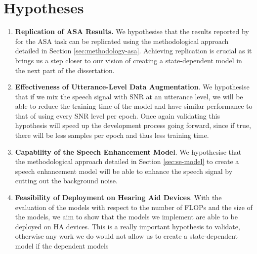 \documentclass[logo,bsc,singlespacing,parskip,online]{infthesis}
\begin{document}
\section{Hypotheses}
\label{sec:hypotheses}
\begin{enumerate}
   \item \textbf{Replication of ASA Results.} 
   We hypothesise that the results reported by \citet{Huwel2020HearDS} for the ASA task can be replicated using the methodological approach detailed in Section \ref{sec:methodology-asa}.
   Achieving replication is crucial as it brings us a step closer to our vision of creating a state-dependent model in the next part of the dissertation.
   \item \textbf{Effectiveness of Utterance-Level Data Augmentation}. We hypothesise 
   that if we mix the speech signal with SNR at an utterance level, we will be able 
   to reduce the training time of the model and have similar performance to that of using 
   every SNR level per epoch. 
   Once again validating this hypothesis will speed up the development process going forward, 
   since if true, there will be less samples per epoch and thus less training time. 
   \item \textbf{Capability of the Speech Enhancement Model}.
   We hypothesise that the methodological approach detailed in Section \ref{sec:se-model} to 
   create a speech enhancement model will be able to enhance the speech signal by 
   cutting out the background noise. 
   \item \textbf{Feasibility of Deployment on Hearing Aid Devices}.
   With the evaluation of the models with respect to the number of FLOPs and the size of the models,
   we aim to show that the models we implement are able to be deployed on HA devices. 
   This is a really important hypothesis to validate, otherwise any work 
   we do would not allow us to create a state-dependent model if the dependent models 

\end{enumerate}
\end{document}
